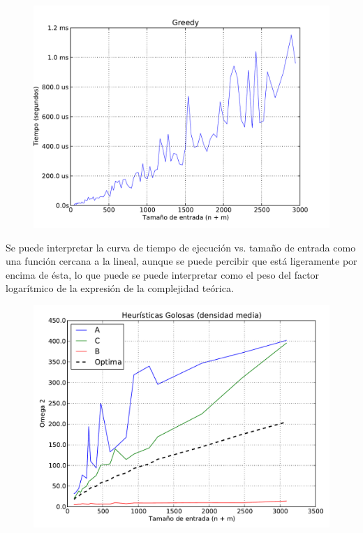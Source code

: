 \begin{figure}[H]
\begin{center}
\includegraphics[angle=0, scale=.75]{imagenes/tiempos_greedy_magic_A.pdf}
\label{grafico local}
\end{center}
\end{figure}

Se puede interpretar la curva de tiempo de ejecución vs. tamaño de entrada como una función cercana a la lineal, aunque se puede percibir
que está ligeramente por encima de ésta, lo que puede se puede interpretar como el peso del factor logarítmico de la expresión de la complejidad teórica.

\begin{figure}[H]
\begin{center}
\includegraphics[angle=0, scale=.75]{imagenes/calidad_greedy_2014-06-27_09-50-48.pdf}
\label{grafico local}
\end{center}
\end{figure}

